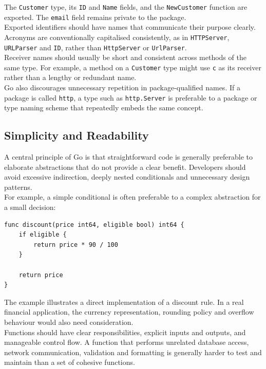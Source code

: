 The \texttt{Customer} type, its \texttt{ID} and \texttt{Name} fields, and the \texttt{NewCustomer} function are exported. The \texttt{email} field remains private to the package.\\

Exported identifiers should have names that communicate their purpose clearly. Acronyms are conventionally capitalised consistently, as in \texttt{HTTPServer}, \texttt{URLParser} and \texttt{ID}, rather than \texttt{HttpServer} or \texttt{UrlParser}.\\

Receiver names should usually be short and consistent across methods of the same type. For example, a method on a \texttt{Customer} type might use \texttt{c} as its receiver rather than a lengthy or redundant name.\\

Go also discourages unnecessary repetition in package-qualified names. If a package is called \texttt{http}, a type such as \texttt{http.Server} is preferable to a package or type naming scheme that repeatedly embeds the same concept.

\subsection{Simplicity and Readability}

A central principle of Go is that straightforward code is generally preferable to elaborate abstractions that do not provide a clear benefit. Developers should avoid excessive indirection, deeply nested conditionals and unnecessary design patterns.\\

For example, a simple conditional is often preferable to a complex abstraction for a small decision:

\begin{lstlisting}
func discount(price int64, eligible bool) int64 {
    if eligible {
        return price * 90 / 100
    }

    return price
}
\end{lstlisting}

The example illustrates a direct implementation of a discount rule. In a real financial application, the currency representation, rounding policy and overflow behaviour would also need consideration.\\

Functions should have clear responsibilities, explicit inputs and outputs, and manageable control flow. A function that performs unrelated database access, network communication, validation and formatting is generally harder to test and maintain than a set of cohesive functions.\\

